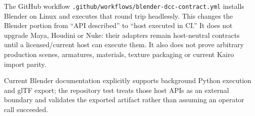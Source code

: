 The GitHub workflow \texttt{.github/workflows/blender-dcc-contract.yml} installs Blender on Linux and executes that round trip headlessly. This changes the Blender portion from ``API described'' to ``host executed in CI.'' It does not upgrade Maya, Houdini or Nuke: their adapters remain host-neutral contracts until a licensed/current host can execute them. It also does not prove arbitrary production scenes, armatures, materials, texture packaging or current Kairo import parity.

Current Blender documentation explicitly supports background Python execution and glTF export; the repository test treats those host APIs as an external boundary and validates the exported artifact rather than assuming an operator call succeeded.
